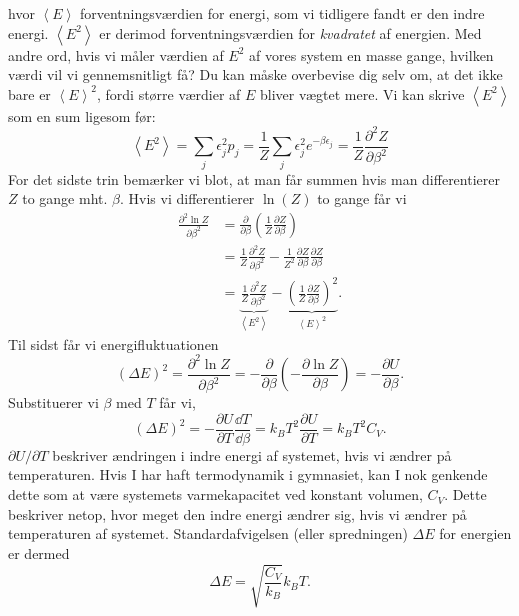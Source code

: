 hvor $\left< E\right>$ forventningsværdien for energi, som vi tidligere fandt er den indre energi. $\left< E^2\right>$ er derimod forventningsværdien for \emph{kvadratet} af energien. Med andre ord, hvis vi måler værdien af $E^2$ af vores system en masse gange, hvilken værdi vil vi gennemsnitligt få? Du kan måske overbevise dig selv om, at det ikke bare er $\left< E\right>^2$, fordi større værdier af $E$ bliver vægtet mere. Vi kan skrive $\left< E^2\right>$ som en sum ligesom før:
\[ \left<E^2\right>=\sum_j \epsilon_j^2p_j=\frac{1}{Z}\sum_j\epsilon_j^2e^{-\beta \epsilon_j}=\frac{1}{Z}\frac{\partial^2 Z}{\partial \beta^2} \]
For det sidste trin bemærker vi blot, at man får summen hvis man differentierer $Z$ to gange mht. $\beta$. Hvis vi differentierer $\ln (Z)$ to gange får vi
\begin{align*}
    \frac{\partial^2 \ln Z}{\partial\beta^2}&=\frac{\partial}{\partial\beta}\left(\frac{1}{Z}\frac{\partial Z}{\partial\beta}\right)\\
    &=\frac{1}{Z}\frac{\partial^2 Z}{\partial\beta^2}-\frac{1}{Z^2}\frac{\partial Z}{\partial\beta}\frac{\partial Z}{\partial\beta}\\
    &=\underbrace{\frac{1}{Z}\frac{\partial^2 Z}{\partial\beta^2}}_{\left<E^2\right>}-\underbrace{\left(\frac{1}{Z}\frac{\partial Z}{\partial\beta}\right)^2}_{\left<E\right>^2}.
\end{align*}
Til sidst får vi energifluktuationen
\begin{equation}
    (\Delta E)^2=\frac{\partial^2 \ln Z}{\partial\beta^2}=-\frac{\partial}{\partial\beta}\left(-\frac{\partial \ln Z}{\partial\beta}\right)=-\frac{\partial U}{\partial\beta}.
\end{equation}
Substituerer vi $\beta$ med $T$ får vi,
\[ (\Delta E)^2=-\frac{\partial U}{\partial T}\frac{\dd T}{\dd \beta}=k_BT^2\frac{\partial U}{\partial T}=k_BT^2C_V. \]
$\partial U/\partial T$ beskriver ændringen i indre energi af systemet, hvis vi ændrer på temperaturen. Hvis I har haft termodynamik i gymnasiet, kan I nok genkende dette som at være systemets varmekapacitet ved konstant volumen, $C_V$. Dette beskriver netop, hvor meget den indre energi ændrer sig, hvis vi ændrer på temperaturen af systemet. Standardafvigelsen (eller spredningen) $\Delta E$ for energien er dermed
\begin{equation}
    \Delta E=\sqrt{\frac{C_V}{k_B}}k_BT.
\end{equation}

